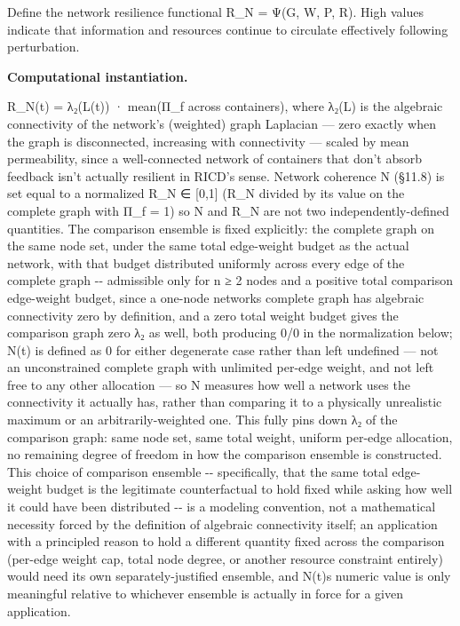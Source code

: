 \documentclass[
]{article}
\begin{document}
Define the network resilience functional R\_N = Ψ(G, W, P, R). High
values indicate that information and resources continue to circulate
effectively following perturbation.

\textbf{Computational instantiation.}

R\_N(t) = λ₂(L(t)) · mean(Π\_f across containers), where λ₂(L) is the
algebraic connectivity of the network's (weighted) graph Laplacian ---
zero exactly when the graph is disconnected, increasing with
connectivity --- scaled by mean permeability, since a well-connected
network of containers that don't absorb feedback isn't actually
resilient in RICD's sense. Network coherence N (§11.8) is set equal to a
normalized R\_N ∈ {[}0,1{]} (R\_N divided by its value on the complete
graph with Π\_f = 1) so N and R\_N are not two independently-defined
quantities. The comparison ensemble is fixed explicitly: the complete
graph on the same node set, under the same total edge-weight budget as
the actual network, with that budget distributed uniformly across every
edge of the complete graph -\/- admissible only for n ≥ 2 nodes and a
positive total comparison edge-weight budget, since a one-node networks
complete graph has algebraic connectivity zero by definition, and a zero
total weight budget gives the comparison graph zero λ₂ as well, both
producing 0/0 in the normalization below; N(t) is defined as 0 for
either degenerate case rather than left undefined --- not an
unconstrained complete graph with unlimited per-edge weight, and not
left free to any other allocation --- so N measures how well a network
uses the connectivity it actually has, rather than comparing it to a
physically unrealistic maximum or an arbitrarily-weighted one. This
fully pins down λ₂ of the comparison graph: same node set, same total
weight, uniform per-edge allocation, no remaining degree of freedom in
how the comparison ensemble is constructed. This choice of comparison
ensemble -\/- specifically, that the same total edge-weight budget is
the legitimate counterfactual to hold fixed while asking how well it
could have been distributed -\/- is a modeling convention, not a
mathematical necessity forced by the definition of algebraic
connectivity itself; an application with a principled reason to hold a
different quantity fixed across the comparison (per-edge weight cap,
total node degree, or another resource constraint entirely) would need
its own separately-justified ensemble, and N(t)\textquotesingle s
numeric value is only meaningful relative to whichever ensemble is
actually in force for a given application.
\end{document}
